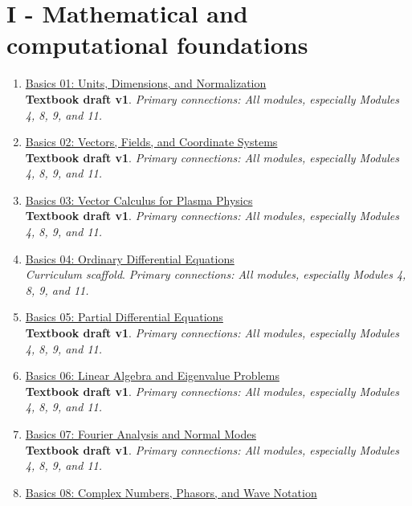 \documentclass[11pt]{article}
\begin{document}
\section{I - Mathematical and computational foundations}
\begin{enumerate}[leftmargin=2.4em]
\item[\textbf{01.}] \href{run:basics_01_units_dimensions_and_normalization.pdf}{Basics 01: Units, Dimensions, and Normalization}\\[-0.2em]
\textbf{Textbook draft v1}. \textit{Primary connections: All modules, especially Modules 4, 8, 9, and 11.}
\item[\textbf{02.}] \href{run:basics_02_vectors_fields_and_coordinate_systems.pdf}{Basics 02: Vectors, Fields, and Coordinate Systems}\\[-0.2em]
\textbf{Textbook draft v1}. \textit{Primary connections: All modules, especially Modules 4, 8, 9, and 11.}
\item[\textbf{03.}] \href{run:basics_03_vector_calculus_for_plasma_physics.pdf}{Basics 03: Vector Calculus for Plasma Physics}\\[-0.2em]
\textbf{Textbook draft v1}. \textit{Primary connections: All modules, especially Modules 4, 8, 9, and 11.}
\item[\textbf{04.}] \href{run:basics_04_ordinary_differential_equations.pdf}{Basics 04: Ordinary Differential Equations}\\[-0.2em]
\textit{Curriculum scaffold}. \textit{Primary connections: All modules, especially Modules 4, 8, 9, and 11.}
\item[\textbf{05.}] \href{run:basics_05_partial_differential_equations.pdf}{Basics 05: Partial Differential Equations}\\[-0.2em]
\textbf{Textbook draft v1}. \textit{Primary connections: All modules, especially Modules 4, 8, 9, and 11.}
\item[\textbf{06.}] \href{run:basics_06_linear_algebra_and_eigenvalue_problems.pdf}{Basics 06: Linear Algebra and Eigenvalue Problems}\\[-0.2em]
\textbf{Textbook draft v1}. \textit{Primary connections: All modules, especially Modules 4, 8, 9, and 11.}
\item[\textbf{07.}] \href{run:basics_07_fourier_analysis_and_normal_modes.pdf}{Basics 07: Fourier Analysis and Normal Modes}\\[-0.2em]
\textbf{Textbook draft v1}. \textit{Primary connections: All modules, especially Modules 4, 8, 9, and 11.}
\item[\textbf{08.}] \href{run:basics_08_complex_numbers_phasors_and_wave_notation.pdf}{Basics 08: Complex Numbers, Phasors, and Wave Notation}\\[-0.2em]

\end{enumerate}
\end{document}
